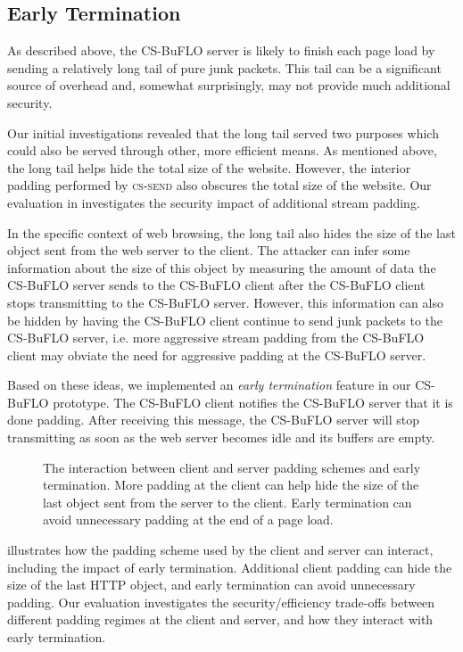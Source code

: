 \documentclass[10pt,journal]{IEEEtran}
\newcommand{\csb} {CS-BuFLO\xspace}
\begin{document}
\subsection{Early Termination}
\label{ssec:early-termination}

As described above, the \csb server is likely to finish each page load
by sending a relatively long tail of pure junk packets.  This tail can
be a significant source of overhead and, somewhat surprisingly, may
not provide much additional security.  

Our initial investigations revealed that the long tail served two
purposes which could also be served through other, more efficient
means.  As mentioned above, the long tail helps hide the total size of
the website.  However, the interior padding performed by
\textsc{cs-send} also obscures the total size of the website.  Our
evaluation in  investigates the security impact of
additional stream padding.

In the specific context of web browsing, the long tail also hides the
size of the last object sent from the web server to the client.  The
attacker can infer some information about the size of this object by
measuring the amount of data the \csb server sends to the \csb client
after the \csb client stops transmitting to the \csb server.  However,
this information can also be hidden by having the \csb client continue
to send junk packets to the \csb server, i.e. more aggressive stream
padding from the \csb client may obviate the need for aggressive
padding at the \csb server.  

Based on these ideas, we implemented an \textit{early termination}
feature in our \csb prototype.  The \csb client notifies the \csb
server that it is done padding.  After receiving this message, the
\csb server will stop transmitting as soon as the web server becomes
idle and its buffers are empty.  

\begin{figure}[t]
  \caption{The interaction between client and server padding schemes
    and early termination.  More padding at the client can help hide
    the size of the last object sent from the server to the client.
    Early termination can avoid unnecessary padding at the end of a
    page load.}
  \label{fig:padding-schemes}
\end{figure}

 illustrates how the padding scheme used by
the client and server can interact, including the impact of early
termination.  Additional client padding can hide the size of the last
HTTP object, and early termination can avoid unnecessary padding.  Our
evaluation investigates the security/efficiency trade-offs between
different padding regimes at the client and server, and how they
interact with early termination.
\end{document}
